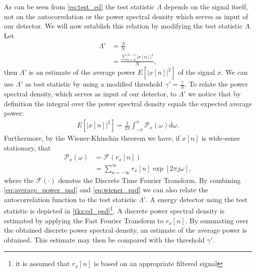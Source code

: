 \documentclass[a4paper, openany, oneside]{memoir}
\begin{document}
As can be seen from \cref{eq:test_ed} the test statistic $\Lambda$ depends on the signal itself, not on the autocorrelation or the power spectral density which serves as input of our detector. We will now establish this relation by modifying the test statistic $\Lambda$.
Let 
\begin{align*}
\Lambda' &= \frac{\Lambda}{N}\\
	&= \frac{\sum_{n=0}^{N-1} |x[n]|^2}{N},
\end{align*}
then $\Lambda'$ is an estimate of the average power $E\left[|x[n]|^2\right]$ of the signal $x$. We can use $\Lambda'$ as test statistic by using a modified threshold $\gamma' = \frac{\gamma}{N}$. To relate the power spectral density, which serves as input of our detector, to $\Lambda'$  we notice that by definition the integral over the power spectral density equals the expected average power:
\begin{align}\label{eq:average_power_psd}
E\left[\left|x[n]\right|^2\right] = \frac{1}{2\pi} \int_{-\pi}^{\pi}\mathcal{P}_x(\omega) \text{d}\omega.
\end{align}
Furthermore, by the Wiener-Khinchin theorem we have, if $x[n]$ is wide-sense stationary, that
\begin{align}\label{eq:wiener_psd}
	\mathcal{P}_x(\omega) &= \mathcal{F}(r_x[n]) \\
	&= \sum_{n=-\infty}^{\infty} r_x[n] \exp [2\pi j\omega],
\end{align}
where the $\mathcal{F}(\cdot)$ denotes the Discrete Time Fourier Transform. 
By combining \cref{eq:average_power_psd} and \cref{eq:wiener_psd} we can also relate the autocorrelation function to the test statistic $\Lambda'$. A energy detector using the test statistic is depicted in \cref{tkz:ed_psd}\footnote{it is assumed that $r_x[n]$ is based on an appropriate filtered signal}. A discrete power spectral density is estimated by applying the Fast Fourier Transform to $r_x[n]$. By summating over the obtained discrete power spectral density, an estimate of the average power is obtained. This estimate may then be compared with the threshold $\gamma'$.  
\end{document}
